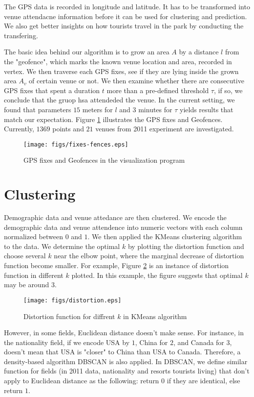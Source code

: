 \documentclass[12pt]{article}
\begin{document}
The GPS data is recorded in longitude and latitude. It has to be transformed into venue attendacne information before it can be used for clustering and prediction. We also get better insights on how tourists travel in the park by conducting the transfering.

The basic idea behind our algorithm is to grow an area $A$ by a distance $l$ from the "geofence", which marks the known venue location and area, recorded in vertex. We then traverse each GPS fixes, see if they are lying inside the grown area $A_v$ of certain venue or not. We then examine whether there are consecutive GPS fixes that spent a duration $t$ more than a pre-defined threshold $\tau$, if so, we conclude that the gruop hsa attendeded the venue. In the current setting, we found that parameters $15$ meters for $l$ and $3$ minutes for $\tau$ yields results that match our expectation. Figure \ref{fixes-fences} illustrates the GPS fixes and Geofences. Currently, $1369$ points and $21$ venues from 2011 experiment are investigated.  

\begin{figure}
\centering
    \texttt{[image: figs/fixes-fences.eps]}
\caption{GPS fixes and Geofences in the visualization program}
\label{fixes-fences}
\end{figure}

\section{Clustering}\label{clustering}
Demographic data and venue attedance are then clustered. We encode the demographic data and venue attendence into numeric vectors with each column normalized between $0$ and $1$. We then applied the KMeans clustering algorithm \cite{Lloyd82} to the data. We determine the optimal $k$ by plotting the distortion function and choose several $k$ near the elbow point, where the marginal decrease of distortion function become smaller. For example, Figure \ref{kmeans-k} is an instance of distortion function in different $k$ plotted. In this example, the figure suggests that optimal $k$ may be around $3$.

\begin{figure}
\centering
    \texttt{[image: figs/distortion.eps]}
\caption{Distortion function for diffrent $k$ in KMeans algorithm}
\label{kmeans-k}
\end{figure}

However, in some fields, Euclidean distance doesn't make sense. For instance, in the nationality field, if we encode USA by $1$, China for $2$, and Canada for $3$, doesn't mean that USA is "closer" to China than USA to Canada. Therefore, a density-based algorithm DBSCAN \cite{Ester96} is also applied. In DBSCAN, we define similar function for fields (in 2011 data, nationality and resorts tourists living) that don't apply to Euclidean distance as the following: return $0$ if they are identical, else return $1$.
\end{document}
